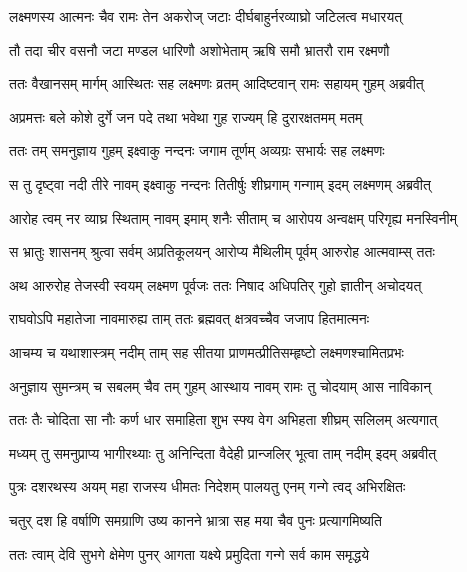 \twolineshloka
{लक्ष्मणस्य आत्मनः चैव रामः तेन अकरोज् जटाः}
{दीर्घबाहुर्नरव्याघ्रो जटिलत्व मधारयत्} %

\twolineshloka
{तौ तदा चीर वसनौ जटा मण्डल धारिणौ}
{अशोभेताम् ऋषि समौ भ्रातरौ राम रक्ष्मणौ} %

\twolineshloka
{ततः वैखानसम् मार्गम् आस्थितः सह लक्ष्मणः}
{व्रतम् आदिष्टवान् रामः सहायम् गुहम् अब्रवीत्} %

\twolineshloka
{अप्रमत्तः बले कोशे दुर्गे जन पदे तथा}
{भवेथा गुह राज्यम् हि दुरारक्षतमम् मतम्} %

\twolineshloka
{ततः तम् समनुज्ञाय गुहम् इक्ष्वाकु नन्दनः}
{जगाम तूर्णम् अव्यग्रः सभार्यः सह लक्ष्मणः} %

\twolineshloka
{स तु दृष्ट्वा नदी तीरे नावम् इक्ष्वाकु नन्दनः}
{तितीर्षुः शीघ्रगाम् गन्गाम् इदम् लक्ष्मणम् अब्रवीत्} %

\twolineshloka
{आरोह त्वम् नर व्याघ्र स्थिताम् नावम् इमाम् शनैः}
{सीताम् च आरोपय अन्वक्षम् परिगृह्य मनस्विनीम्} %

\twolineshloka
{स भ्रातुः शासनम् श्रुत्वा सर्वम् अप्रतिकूलयन्}
{आरोप्य मैथिलीम् पूर्वम् आरुरोह आत्मवाम्स् ततः} %

\twolineshloka
{अथ आरुरोह तेजस्वी स्वयम् लक्ष्मण पूर्वजः}
{ततः निषाद अधिपतिर् गुहो ज्ञातीन् अचोदयत्} %

\twolineshloka
{राघवोऽपि महातेजा नावमारुह्य ताम् ततः}
{ब्रह्मवत् क्षत्रवच्चैव जजाप हितमात्मनः} %

\twolineshloka
{आचम्य च यथाशास्त्रम् नदीम् ताम् सह सीतया}
{प्राणमत्प्रीतिसम्हृष्टो लक्ष्मणश्चामितप्रभः} %

\twolineshloka
{अनुज्ञाय सुमन्त्रम् च सबलम् चैव तम् गुहम्}
{आस्थाय नावम् रामः तु चोदयाम् आस नाविकान्} %

\twolineshloka
{ततः तैः चोदिता सा नौः कर्ण धार समाहिता}
{शुभ स्फ्य वेग अभिहता शीघ्रम् सलिलम् अत्यगात्} %

\twolineshloka
{मध्यम् तु समनुप्राप्य भागीरथ्याः तु अनिन्दिता}
{वैदेही प्रान्जलिर् भूत्वा ताम् नदीम् इदम् अब्रवीत्} %

\twolineshloka
{पुत्रः दशरथस्य अयम् महा राजस्य धीमतः}
{निदेशम् पालयतु एनम् गन्गे त्वद् अभिरक्षितः} %

\twolineshloka
{चतुर् दश हि वर्षाणि समग्राणि उष्य कानने}
{भ्रात्रा सह मया चैव पुनः प्रत्यागमिष्यति} %

\twolineshloka
{ततः त्वाम् देवि सुभगे क्षेमेण पुनर् आगता}
{यक्ष्ये प्रमुदिता गन्गे सर्व काम समृद्धये} %

